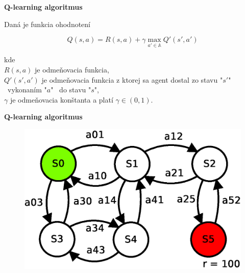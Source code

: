 \documentclass[xcolor=dvipsnames]{beamer}
\begin{document}
\begin{frame}{\bf Q-learning algoritmus}

Daná je funkcia ohodnotení

\begin{equation} \label{eu_eqn}
Q(s,a) = R(s,a) + \gamma \max_{a' \in \mathbb{A}} Q'(s', a')
\end{equation}

kde \\
$R(s,a)$ je odmeňovacia funkcia, \\
$Q'(s',a')$ je odmeňovacia funkcia z ktorej sa agent dostal zo stavu "$s'$" \ vykonaním "$a$" \ do
stavu "$s$", \\
$\gamma$ je odmeňovacia konštanta a platí $\gamma \in (0, 1)$.

\end{frame}



\begin{frame}{\bf Q-learning algoritmus}

\begin{figure}[!htb]
\includegraphics[scale=.5]{../diagrams/q_learning_table_01.eps}
\end{figure}

\end{frame}
\end{document}
